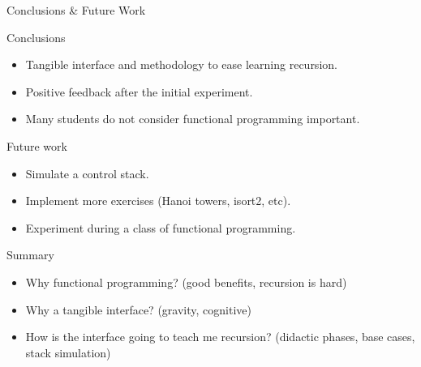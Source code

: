 \begin{frame}{Conclusions \& Future Work}
  \begin{block} {Conclusions}
    \begin{itemize}
    \item Tangible interface and methodology to ease learning recursion.
    \item Positive feedback after the initial experiment.
    \item Many students do not consider functional programming important.
    \end{itemize}
  \end{block}
  \begin{block} {Future work}
    \begin{itemize}
    \item Simulate a control stack.
    \item Implement more exercises (Hanoi towers, isort2, etc).
    \item Experiment during a class of functional programming.
    \end{itemize}
  \end{block}
\end{frame}

\begin{frame}{Summary}
  \begin{itemize}
  \item Why functional programming? (good benefits, recursion is hard)
  \item Why a tangible interface? (gravity, cognitive)
  \item How is the interface going to teach me recursion?
    (didactic phases, base cases, stack simulation)
  \end{itemize}
\end{frame}


